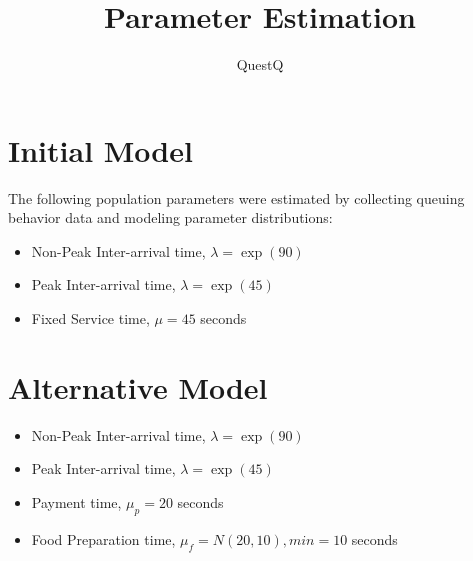 \documentclass{article}
\begin{document}
\pagecolor{ultramarine}
\title{Parameter Estimation}
\author{QuestQ}
\date{}
\maketitle
\section{Initial Model}
The following population parameters were estimated by collecting queuing
behavior data and modeling parameter distributions:
\begin{itemize}
    \item Non-Peak Inter-arrival time, $\lambda = \exp(90)$
    \item Peak Inter-arrival time, $\lambda = \exp(45)$
    \item Fixed Service time, $\mu = 45$ seconds
\end{itemize}
\section{Alternative Model}
\begin{itemize}
    \item Non-Peak Inter-arrival time, $\lambda = \exp(90)$
    \item Peak Inter-arrival time, $\lambda = \exp(45)$
    \item Payment time, $\mu_p = 20$ seconds
    \item Food Preparation time, $\mu_f = N(20,10), min=10$ seconds
\end{itemize}
\end{document}
